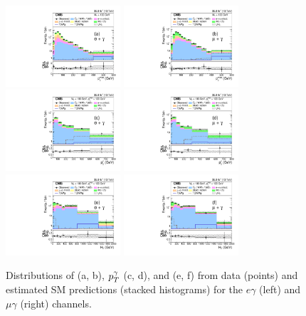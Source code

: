 \documentclass[thesis.tex]{subfiles}
\renewcommand\_{\textunderscore\allowbreak}
\begin{document}
\begin{figure}[tbp]
\centering
\includegraphics[width=0.38\textwidth]{Fig/Figure_004-a.pdf}
\includegraphics[width=0.38\textwidth]{Fig/Figure_004-b.pdf} \\
\includegraphics[width=0.38\textwidth]{Fig/Figure_004-c.pdf}
\includegraphics[width=0.38\textwidth]{Fig/Figure_004-d.pdf} \\
\includegraphics[width=0.38\textwidth]{Fig/Figure_004-e.pdf}
\includegraphics[width=0.38\textwidth]{Fig/Figure_004-f.pdf}
\caption{Distributions of \ptmiss (a, b), $p_T^{\mathrm{\gamma}}$ (c, d), and \HT
  (e, f) from data (points) and estimated SM predictions (stacked
  histograms) for the $e\gamma$ (left) and $\mu\gamma$ (right)
  channels.}
\label{fig:signalPhoPt} 
\end{figure}
\end{document}
